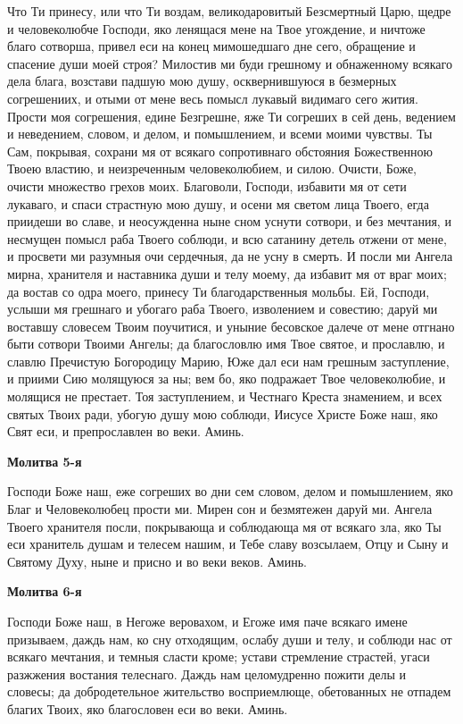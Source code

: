 Что Ти принесу, или что Ти воздам, великодаровитый Безсмертный Царю, щедре и человеколюбче Господи, яко ленящася мене на Твое угождение, и ничтоже благо сотворша, привел еси на конец мимошедшаго дне сего, обращение и спасение души моей строя? Милостив ми буди грешному и обнаженному всякаго дела блага, возстави падшую мою душу, осквернившуюся в безмерных согрешениих, и отыми от мене весь помысл лукавый видимаго сего жития. Прости моя согрешения, едине Безгрешне, яже Ти согреших в сей день, ведением и неведением, словом, и делом, и помышлением, и всеми моими чувствы. Ты Сам, покрывая, сохрани мя от всякаго сопротивнаго обстояния Божественною Твоею властию, и неизреченным человеколюбием, и силою. Очисти, Боже, очисти множество грехов моих. Благоволи, Господи, избавити мя от сети лукаваго, и спаси страстную мою душу, и осени мя светом лица Твоего, егда приидеши во славе, и неосужденна ныне сном уснути сотвори, и без мечтания, и несмущен помысл раба Твоего соблюди, и всю сатанину детель отжени от мене, и просвети ми разумныя очи сердечныя, да не усну в смерть. И посли ми Ангела мирна, хранителя и наставника души и телу моему, да избавит мя от враг моих; да востав со одра моего, принесу Ти благодарственныя мольбы. Ей, Господи, услыши мя грешнаго и убогаго раба Твоего, изволением и совестию; даруй ми воставшу словесем Твоим поучитися, и уныние бесовское далече от мене отгнано быти сотвори Твоими Ангелы; да благословлю имя Твое святое, и прославлю, и славлю Пречистую Богородицу Марию, Юже дал еси нам грешным заступление, и приими Сию молящуюся за ны; вем бо, яко подражает Твое человеколюбие, и молящися не престает. Тоя заступлением, и Честнаго Креста знамением, и всех святых Твоих ради, убогую душу мою соблюди, Иисусе Христе Боже наш, яко Свят еси, и препрославлен во веки. Аминь.


\medskip
\bfseries Молитва 5-я\normalfont{}\nopagebreak


Господи Боже наш, еже согреших во дни сем словом, делом и помышлением, яко Благ и Человеколюбец прости ми. Мирен сон и безмятежен даруй ми. Ангела Твоего хранителя посли, покрывающа и соблюдающа мя от всякаго зла, яко Ты еси хранитель душам и телесем нашим, и Тебе славу возсылаем, Отцу и Сыну и Святому Духу, ныне и присно и во веки веков. Аминь.


\medskip
\bfseries Молитва 6-я\normalfont{}\nopagebreak


Господи Боже наш, в Негоже веровахом, и Егоже имя паче всякаго имене призываем, даждь нам, ко сну отходящим, ослабу души и телу, и соблюди нас от всякаго мечтания, и темныя сласти кроме; устави стремление страстей, угаси разжжения востания телеснаго. Даждь нам целомудренно пожити делы и словесы; да добродетельное жительство восприемлюще, обетованных не отпадем благих Твоих, яко благословен еси во веки. Аминь.


